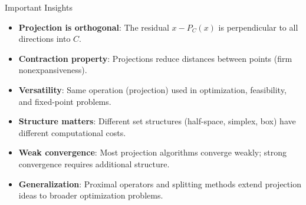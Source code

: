\documentclass[aspectratio=169,10pt]{beamer}
\begin{document}
\begin{frame}{Important Insights}

    \begin{itemize}
        \item \textbf{Projection is orthogonal}: The residual $x - P_C(x)$ is perpendicular to all directions into $C$.

        \vspace{0.3cm}

        \item \textbf{Contraction property}: Projections reduce distances between points (firm nonexpansiveness).

        \vspace{0.3cm}

        \item \textbf{Versatility}: Same operation (projection) used in optimization, feasibility, and fixed-point problems.

        \vspace{0.3cm}

        \item \textbf{Structure matters}: Different set structures (half-space, simplex, box) have different computational costs.

        \vspace{0.3cm}

        \item \textbf{Weak convergence}: Most projection algorithms converge weakly; strong convergence requires additional structure.

        \vspace{0.3cm}

        \item \textbf{Generalization}: Proximal operators and splitting methods extend projection ideas to broader optimization problems.
    \end{itemize}

\end{frame}
\end{document}
